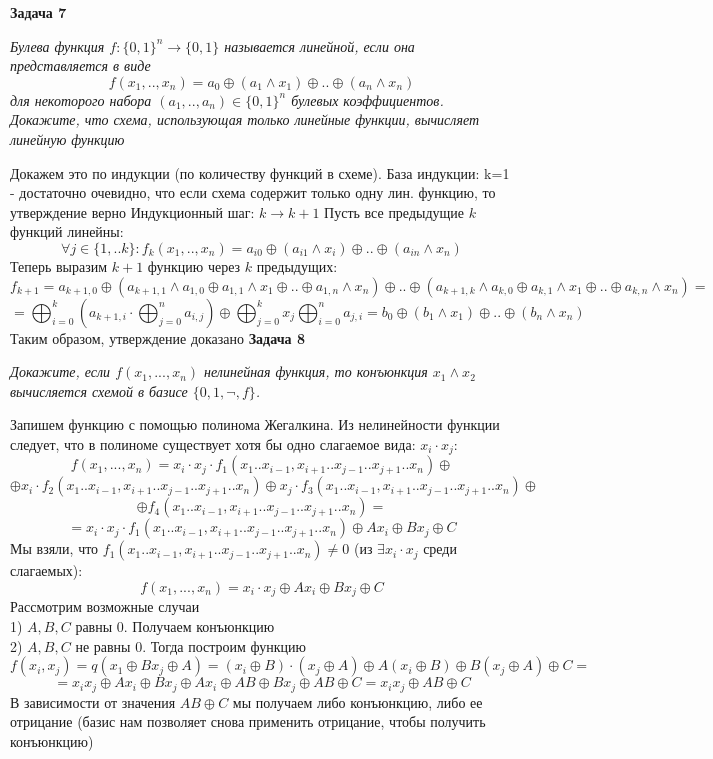 \documentclass{article}
\begin{document}
\newline
\newline
 \noindent \textbf{Задача 7}
\begin{center}
\textit{Булева функция $f : \{0, 1\}^n \to \{0, 1\}$ называется линейной, если она представляется в виде $$f(x_1,..,x_n)=a_0 \oplus(a_1 \wedge x_1)\oplus..\oplus(a_n \wedge x_n)$$
для некоторого набора $(a_1,.., a_n) \in \{0, 1\}^n$ булевых коэффициентов.
Докажите, что схема, использующая только линейные функции, вычисляет линейную функцию}
\end{center}
Докажем это по индукции (по количеству функций в схеме).
База индукции: k=1 - достаточно очевидно, что если схема содержит только одну лин. функцию, то утверждение верно
Индукционный шаг: $k \rightarrow k+1$
Пусть все предыдущие $k$ функций линейны:
$$\forall j\in\{1,..k\}: f_k (x_1,..,x_n)=a_{i0} \oplus(a_{i1} \wedge x_{i})\oplus..\oplus(a_{in} \wedge x_n)$$
Теперь выразим $k+1$ функцию через $k$ предыдущих: 
$$f_{k+1}=a_{k+1,0}\oplus (a_{k+1,1}\wedge a_{1,0}\oplus a_{1,1}\wedge x_1\oplus..\oplus a_{1,n}\wedge x_n) \oplus .. \oplus (a_{k+1,k}\wedge a_{k,0}\oplus a_{k,1}\wedge x_1\oplus..\oplus a_{k,n}\wedge x_n) = $$
$$=\bigoplus_{i=0}^k( a_{k+1,i} \cdot \bigoplus_{j=0}^n a_{i,j}) \oplus \bigoplus_{j=0}^k x_j \bigoplus_{i=0}^n a_{j,i} = b_0 \oplus (b_1 \wedge x_1)\oplus..\oplus(b_n \wedge x_n)$$
Таким образом, утверждение доказано
\newline
\newline 
\noindent \textbf{Задача 8}
\begin{center}
\textit{Докажите, если $f(x_1,...,x_n)$   нелинейная функция, то конъюнкция $x_1\wedge x_2$ вычисляется схемой в базисе $\{0, 1, \neg, f \}$.}
\end{center}
Запишем функцию с помощью полинома Жегалкина. Из нелинейности функции следует, что в полиноме существует хотя бы одно слагаемое вида: $x_i\cdot x_j$:
$$f(x_1,...,x_n) = x_i\cdot x_j\cdot f_1(x_1..x_{i-1},x_{i+1}..x_{j-1}..x_{j+1}..x_n)\oplus $$ 
$$\oplus x_i \cdot f_2(x_1..x_{i-1},x_{i+1}..x_{j-1}..x_{j+1}..x_n)\oplus x_j \cdot f_3(x_1..x_{i-1},x_{i+1}..x_{j-1}..x_{j+1}..x_n)\oplus $$
 $$\oplus f_4(x_1..x_{i-1},x_{i+1}..x_{j-1}..x_{j+1}..x_n) = $$
$$= x_i \cdot x_j \cdot f_1(x_1..x_{i-1},x_{i+1}..x_{j-1}..x_{j+1}..x_n) \oplus Ax_i \oplus Bx_j \oplus C$$
Мы взяли, что  $f_1(x_1..x_{i-1},x_{i+1}..x_{j-1}..x_{j+1}..x_n) \neq 0$ (из $\exists x_i \cdot x_j$ среди слагаемых):
$$f(x_1,...,x_n) = x_i \cdot x_j \oplus Ax_i \oplus Bx_j \oplus C$$ Рассмотрим возможные случаи\\
1) $A, B,C$ равны 0. Получаем конъюнкцию\\
2) $A, B,C$ не равны 0. Тогда построим функцию 
$$f (x_i,x_j) = q(x_1 \oplus Bx_j \oplus A) = (x_i \oplus B) \cdot (x_j \oplus A) \oplus A(x_i \oplus B) \oplus B(x_j \oplus A) \oplus C = $$
$$ = x_i x_j \oplus Ax_i \oplus Bx_j \oplus Ax_i \oplus AB \oplus Bx_j \oplus AB \oplus C = x_i x_j \oplus AB\oplus C$$ 
В зависимости от значения $AB\oplus C$ мы получаем либо конъюнкцию, либо ее отрицание (базис нам позволяет снова применить отрицание, чтобы получить конъюнкцию) 
\newline
 \newline
\end{document}
